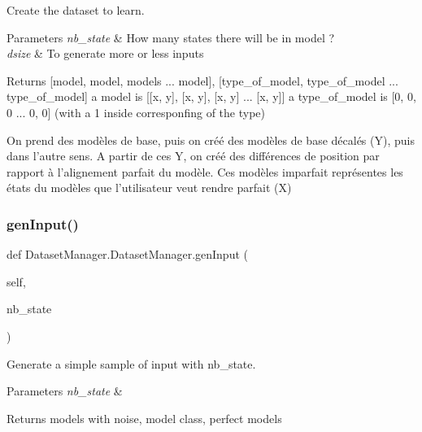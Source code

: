 Create the dataset to learn. 


\begin{DoxyParams}{Parameters}
{\em nb\+\_\+state} & How many states there will be in model ? \\
\hline
{\em dsize} & To generate more or less inputs \\
\hline
\end{DoxyParams}
\begin{DoxyReturn}{Returns}
\mbox{[}model, model, models ... model\mbox{]}, \mbox{[}type\+\_\+of\+\_\+model, type\+\_\+of\+\_\+model ... type\+\_\+of\+\_\+model\mbox{]} a model is \mbox{[}\mbox{[}x, y\mbox{]}, \mbox{[}x, y\mbox{]}, \mbox{[}x, y\mbox{]} ... \mbox{[}x, y\mbox{]}\mbox{]} a type\+\_\+of\+\_\+model is \mbox{[}0, 0, 0 ... 0, 0\mbox{]} (with a 1 inside corresponfing of the type) \begin{DoxyVerb}On prend des modèles de base, puis on créé des modèles de base décalés (Y), puis dans l'autre sens.
A partir de ces Y, on créé des différences de position par rapport à l'alignement parfait du modèle.
Ces modèles imparfait représentes les états du modèles que l'utilisateur veut rendre parfait (X)\end{DoxyVerb}
 
\end{DoxyReturn}
\mbox{\label{classDatasetManager_1_1DatasetManager_aa947266c3671f93a2cc1d71722bb556f}} 
\subsubsection{\texorpdfstring{genInput()}{genInput()}}
{\footnotesize\ttfamily def Dataset\+Manager.\+Dataset\+Manager.\+gen\+Input (\begin{DoxyParamCaption}\item[{}]{self,  }\item[{}]{nb\+\_\+state }\end{DoxyParamCaption})}



Generate a simple sample of input with nb\+\_\+state. 


\begin{DoxyParams}{Parameters}
{\em nb\+\_\+state} & \\
\hline
\end{DoxyParams}
\begin{DoxyReturn}{Returns}
models with noise, model class, perfect models 
\end{DoxyReturn}
\mbox{\label{classDatasetManager_1_1DatasetManager_a35353a0d4eb0a3821142d78c88987aea}} 
